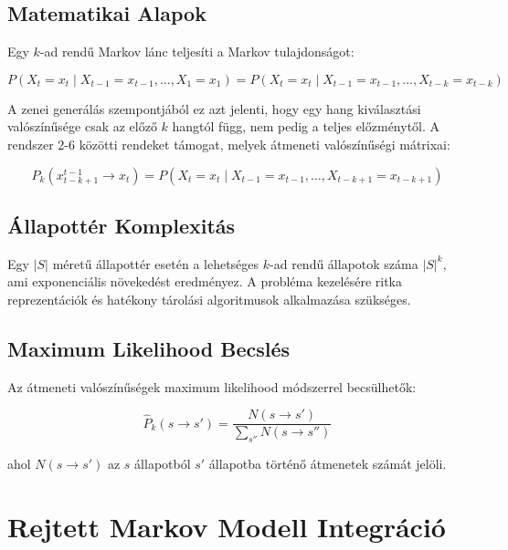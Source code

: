 \subsection{Matematikai Alapok}

Egy $k$-ad rendű Markov lánc teljesíti a Markov tulajdonságot:

\begin{equation}
P(X_t = x_t \mid X_{t-1} = x_{t-1}, \ldots, X_1 = x_1) = P(X_t = x_t \mid X_{t-1} = x_{t-1}, \ldots, X_{t-k} = x_{t-k})
\end{equation}

A zenei generálás szempontjából ez azt jelenti, hogy egy hang kiválasztási valószínűsége csak az előző $k$ hangtól függ, nem pedig a teljes előzménytől. A rendszer 2-6 közötti rendeket támogat, melyek átmeneti valószínűségi mátrixai:

\begin{equation}
P_{k}(x_{t-k+1}^{t-1} \rightarrow x_t) = P(X_t = x_t \mid X_{t-1} = x_{t-1}, \ldots, X_{t-k+1} = x_{t-k+1})
\end{equation}

\subsection{Állapottér Komplexitás}

Egy $|S|$ méretű állapottér esetén a lehetséges $k$-ad rendű állapotok száma $|S|^k$, ami exponenciális növekedést eredményez. A probléma kezelésére ritka reprezentációk és hatékony tárolási algoritmusok alkalmazása szükséges.

\subsection{Maximum Likelihood Becslés}

Az átmeneti valószínűségek maximum likelihood módszerrel becsülhetők:

\begin{equation}
\hat{P}_{k}(s \rightarrow s') = \frac{N(s \rightarrow s')}{\sum_{s''} N(s \rightarrow s'')}
\end{equation}

ahol $N(s \rightarrow s')$ az $s$ állapotból $s'$ állapotba történő átmenetek számát jelöli.

\section{Rejtett Markov Modell Integráció}


